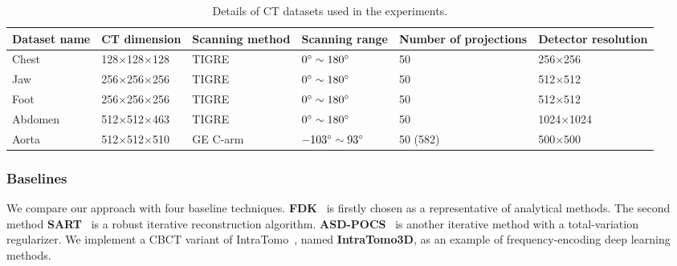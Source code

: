 \documentclass[runningheads]{llncs}
\begin{document}
\begin{table}[!b]
\scriptsize
\vspace{-2em}
\centering
\caption{Details of CT datasets used in the experiments.}
\label{tab:dataset}
\begin{tabular}{m{}<{\centering}|m{}<{\centering}m{}<{\centering}m{}<{\centering}m{}<{\centering}m{}<{\centering}}
\toprule
Dataset name & CT dimension & Scanning method & Scanning range & Number of projections & Detector resolution \\ \midrule
Chest~\cite{armato2011lung}   & 128$\times$128$\times$128  & TIGRE~\cite{biguri2016tigre} & $0\degree\sim180\degree$ & 50 & 256$\times$256 \\
Jaw~\cite{Klacansky2022Open}     & 256$\times$256$\times$256  & TIGRE~\cite{biguri2016tigre} & $0\degree\sim180\degree$ & 50 & 512$\times$512 \\
Foot~\cite{Klacansky2022Open}    & 256$\times$256$\times$256  & TIGRE~\cite{biguri2016tigre} & $0\degree\sim180\degree$ & 50 & 512$\times$512 \\
Abdomen~\cite{Klacansky2022Open} & 512$\times$512$\times$463  & TIGRE~\cite{biguri2016tigre} & $0\degree\sim180\degree$ & 50 & 1024$\times$1024 \\
Aorta   & 512$\times$512$\times$510  & GE C-arm & $-103\degree\sim93\degree$ & 50 (582) & 500$\times$500 \\ \bottomrule
\end{tabular}
\end{table}

\subsubsection{Baselines}
We compare our approach with four baseline techniques. \textbf{FDK}~\cite{feldkamp1984practical} is firstly chosen as a representative of analytical methods. The second method \textbf{SART}~\cite{andersen1984simultaneous} is a robust iterative reconstruction algorithm. \textbf{ASD-POCS}~\cite{sidky2008image} is another iterative method with a total-variation regularizer. We implement a CBCT variant of IntraTomo~\cite{zang2021intratomo}, named  \textbf{IntraTomo3D}, as an example of frequency-encoding deep learning methods.
\end{document}
